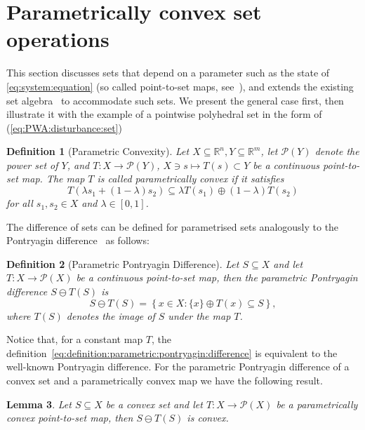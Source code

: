 \documentclass[letterpaper, 10pt, conference]{ieeeconf} %
\newtheorem{thm}{Lemma}[section]
\newtheorem{defn}[thm]{Definition}
\begin{document}
\section{Parametrically convex set operations}\label{sec:parametrically:convex:set:operations}
This section discusses sets that depend on a parameter such as the state of \eqref{eq:system:equation} 
(so called point-to-set maps, see~\cite{Hogan:1973}), and extends the existing set algebra~\cite{blanchini:2007} to 
accommodate such sets. We present the general case first, then illustrate it with the example 
of a pointwise polyhedral set in the form of (\ref{eq:PWA:disturbance:set})
%
%
    \begin{defn}[Parametric Convexity]\label{def:parametric:convexity}
      Let $X\subseteq\mathbb R^n, Y\subseteq\mathbb R^m$, let $\mathcal P(Y)$ denote the power set of $Y$, 
      and $T:X\rightarrow \mathcal P(Y)$, $X\ni s\mapsto T(s)\subset Y$ be a 
      continuous point-to-set map. The map $T$ is called \emph{parametrically convex} if it satisfies
      \begin{equation}\label{eq:pconvexdef}
        T(\lambda s_1 + (1-\lambda)s_2)\subseteq\lambda T(s_1) \oplus (1-\lambda) T(s_2)
      \end{equation}
      for all $s_1,s_2\in X$ and $\lambda\in[0,1]$.
    \end{defn}
%
The difference of sets can be defined for parametrised sets analogously to the Pontryagin difference~\cite{Kolmanovsky:1998} as follows:
%
\begin{defn}[Parametric Pontryagin Difference]\label{def:parametric:pontryagin:difference}
Let $S\subseteq X$ and let $T:X\to\mathcal P(X)$ be a continuous point-to-set map,
then the \emph{parametric Pontryagin difference} $S\ominus T(S)$ is 
      \begin{equation}\label{eq:definition:parametric:pontryagin:difference}
        S\ominus T(S) = \left\{x\in X: \{x\} \oplus T(x)\subseteq S\right\},
      \end{equation}
      where $T(S)$ denotes the image of $S$ under the map $T$. 
    \end{defn}
%
Notice that, for a constant map $T$, the definition~\eqref{eq:definition:parametric:pontryagin:difference} is equivalent to the 
well-known Pontryagin difference.
For the parametric Pontryagin difference of a convex set and a parametrically convex map we have the following result.
%
\begin{thm}\label{thm:convexity:of:pontryagin:difference}
  Let $S\subseteq X$ be a convex set and let $T:X\rightarrow\mathcal P(X)$ be a parametrically convex point-to-set
  map, then $S\ominus T(S)$ is convex. 
\end{thm}
\end{document}
